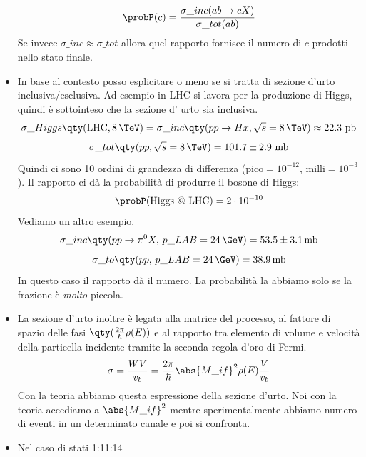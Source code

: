 \begin{itemize}
        \begin{equation*}
        \probP(c)=\frac{\sigma\_{inc}(ab\to cX)}{\sigma\_{tot}(ab)}
        \end{equation*} 
        Se invece $\sigma\_{inc}\approx\sigma\_{tot}$ allora quel rapporto fornisce il numero di $c$ prodotti nello stato finale. 
        \item In base al contesto posso esplicitare o meno se si tratta di sezione d'urto inclusiva/esclusiva. Ad esempio in LHC si lavora per la produzione di Higgs, quindi è sottointeso che la sezione d' urto sia inclusiva.
        \begin{equation*}
        \sigma\_{Higgs}\qty(\text{LHC},8\,\TeV)=\sigma\_{inc}\qty(pp\to Hx,\sqrt s =8\,\TeV)\approx22.3 \text{ pb}
        \end{equation*}
        \begin{equation*}
        \sigma\_{tot}\qty(pp,\sqrt s=8\,\TeV)=101.7\pm2.9\text{ mb}
        \end{equation*}
        Quindi ci sono 10 ordini di grandezza di differenza (pico$=10^{-12}$, milli$=10^{-3}$). Il rapporto ci dà la probabilità di produrre il bosone di Higgs:
        \begin{equation*}
            \probP(\text{Higgs @ LHC})=2\cdot 10^{-10}
        \end{equation*}
        Vediamo un altro esempio.
        \begin{equation*}
            \sigma\_{inc}\qty(pp\to\pi^0X,\,p\_{LAB}=24\,\GeV)=53.5\pm3.1\,\text{mb}
        \end{equation*}
        \begin{equation*}
            \sigma\_{to}\qty(pp,\,p\_{LAB}=24\,\GeV)=38.9\,\text{mb}
        \end{equation*}
        In questo caso il rapporto dà il numero. La probabilità la abbiamo solo se la frazione è \textit{molto} piccola.
        \item La sezione d'urto inoltre è legata alla matrice del processo, al fattore di spazio delle fasi $\qty(\frac{2\pi}\hbar\rho(E))$ e al rapporto tra elemento di volume e velocità della particella incidente tramite la seconda regola d'oro di Fermi.
        \begin{equation*}
            \sigma=\frac{WV}{v_b}=\frac{2\pi}\hbar\abs{M\_{if}}^2\rho(E)\frac V {v_b}
        \end{equation*}
        Con la teoria abbiamo questa espressione della sezione d'urto. Noi con la teoria accediamo a $\abs{M\_{if}}^2$ mentre sperimentalmente abbiamo numero di eventi in un determinato canale e poi si confronta.
        \item Nel caso di stati 1:11:14
\end{itemize}